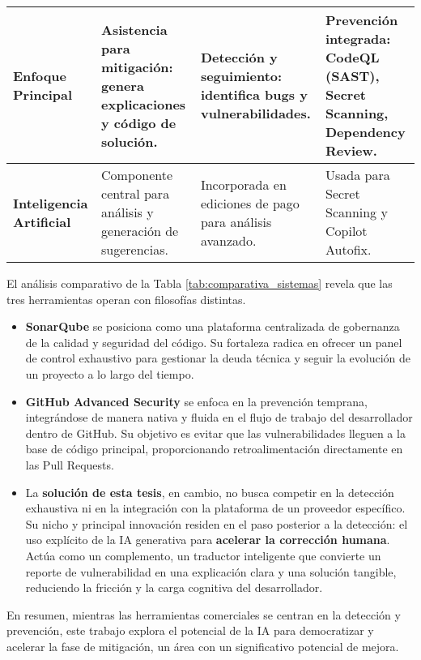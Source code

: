 \begin{table}[h!]
\begin{tabular}{|p{2.6cm}|p{3.9cm}|p{3.9cm}|p{3.9cm}|}
\textbf{Enfoque Principal} & 
\textbf{Asistencia para mitigación}: genera explicaciones y código de solución. & 
\textbf{Detección y seguimiento}: identifica bugs y vulnerabilidades. & 
\textbf{Prevención integrada}: CodeQL (SAST), Secret Scanning, Dependency Review. \\ \hline

\textbf{Inteligencia Artificial} & 
Componente central para análisis y generación de sugerencias. & 
Incorporada en ediciones de pago para análisis avanzado. & 
Usada para Secret Scanning y Copilot Autofix. \\ \hline

\end{tabular}
\end{table}


El análisis comparativo de la Tabla \ref{tab:comparativa_sistemas} revela que las tres herramientas operan con filosofías distintas. 
\begin{itemize}
    \item \textbf{SonarQube} se posiciona como una plataforma centralizada de gobernanza de la calidad y seguridad del código. Su fortaleza radica en ofrecer un panel de control exhaustivo para gestionar la deuda técnica y seguir la evolución de un proyecto a lo largo del tiempo.
    \item \textbf{GitHub Advanced Security} se enfoca en la prevención temprana, integrándose de manera nativa y fluida en el flujo de trabajo del desarrollador dentro de GitHub. Su objetivo es evitar que las vulnerabilidades lleguen a la base de código principal, proporcionando retroalimentación directamente en las Pull Requests.
    \item La \textbf{solución de esta tesis}, en cambio, no busca competir en la detección exhaustiva ni en la integración con la plataforma de un proveedor específico. Su nicho y principal innovación residen en el paso posterior a la detección: el uso explícito de la IA generativa para \textbf{acelerar la corrección humana}. Actúa como un complemento, un traductor inteligente que convierte un reporte de vulnerabilidad en una explicación clara y una solución tangible, reduciendo la fricción y la carga cognitiva del desarrollador.
\end{itemize}

En resumen, mientras las herramientas comerciales se centran en la detección y prevención, este trabajo explora el potencial de la IA para democratizar y acelerar la fase de mitigación, un área con un significativo potencial de mejora.

